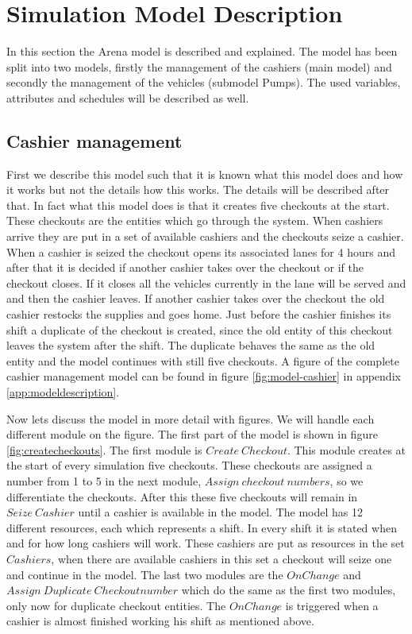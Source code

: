\section{Simulation Model Description}

In this section the Arena model is described and explained. The model has been split into two models, firstly the management of the cashiers (main model) and secondly the management of the vehicles (submodel Pumps). The used variables, attributes and schedules will be described as well.

\subsection{Cashier management}
First we describe this model such that it is known what this model does and how it works but not the details how this works. The details will be described after that. In fact what this model does is that it creates five checkouts at the start. These checkouts are the entities which go through the system. When cashiers arrive they are put in a set of available cashiers and the checkouts seize a cashier. When a cashier is seized the checkout opens its associated lanes for 4 hours and after that it is decided if another cashier takes over the checkout or if the checkout closes. If it closes all the vehicles currently in the lane will be served and and then the cashier leaves. If another cashier takes over the checkout the old cashier restocks the supplies and goes home. Just before the cashier finishes its shift a duplicate of the checkout is created, since the old entity of this checkout leaves the system after the shift. The duplicate behaves the same as the old entity and the model continues with still five checkouts. A figure of the complete cashier management model can be found in figure \ref{fig:model-cashier} in appendix \ref{app:modeldescription}.

Now lets discuss the model in more detail with figures. We will handle each different module on the figure. The first part of the model is shown in  figure \ref{fig:createcheckouts}. The first module is $Create \ Checkout$. This module creates at the start of every simulation five checkouts. These checkouts are assigned a number from 1 to 5 in the next module, $Assign \ checkout \ numbers$, so we differentiate the checkouts. After this these five checkouts will remain in $Seize \ Cashier$ until a cashier is available in the model. The model has 12 different resources, each which represents a shift. In every shift it is stated when and for how long cashiers will work. These cashiers are put as resources in the set $Cashiers$, when there are available cashiers in this set a checkout will seize one and continue in the model. 
The last two modules are the $OnChange$ and $Assign \ Duplicate \ Checkoutnumber$ which do the same as the first two modules, only now for duplicate checkout entities. The $OnChange$ is triggered when a cashier is almost finished working his shift as mentioned above.


